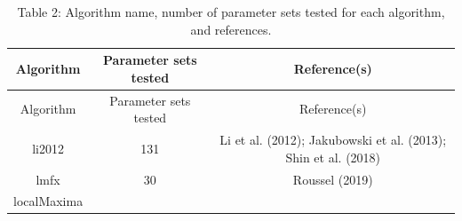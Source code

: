 \documentclass[]{article}
\begin{document}
\begin{longtable}[]{@{}ccc@{}}
\caption{Table 2: Algorithm name, number of parameter sets tested for
each algorithm, and references.}\tabularnewline
\toprule
\begin{minipage}[b]{0.18\columnwidth}\centering\strut
Algorithm\strut
\end{minipage} & \begin{minipage}[b]{0.22\columnwidth}\centering\strut
Parameter sets tested\strut
\end{minipage} & \begin{minipage}[b]{0.34\columnwidth}\centering\strut
Reference(s)\strut
\end{minipage}\tabularnewline
\midrule
\endfirsthead
\toprule
\begin{minipage}[b]{0.18\columnwidth}\centering\strut
Algorithm\strut
\end{minipage} & \begin{minipage}[b]{0.22\columnwidth}\centering\strut
Parameter sets tested\strut
\end{minipage} & \begin{minipage}[b]{0.34\columnwidth}\centering\strut
Reference(s)\strut
\end{minipage}\tabularnewline
\midrule
\endhead
\begin{minipage}[t]{0.18\columnwidth}\centering\strut
li2012\strut
\end{minipage} & \begin{minipage}[t]{0.22\columnwidth}\centering\strut
131\strut
\end{minipage} & \begin{minipage}[t]{0.34\columnwidth}\centering\strut
Li et al. (2012); Jakubowski et al. (2013); Shin et al. (2018)\strut
\end{minipage}\tabularnewline
\begin{minipage}[t]{0.18\columnwidth}\centering\strut
lmfx\strut
\end{minipage} & \begin{minipage}[t]{0.22\columnwidth}\centering\strut
30\strut
\end{minipage} & \begin{minipage}[t]{0.34\columnwidth}\centering\strut
Roussel (2019)\strut
\end{minipage}\tabularnewline
\begin{minipage}[t]{0.18\columnwidth}\centering\strut
localMaxima\strut
\end{minipage} & \begin{minipage}[t]{0.22\columnwidth}\centering\strut

\end{minipage}
\end{longtable}
\end{document}
